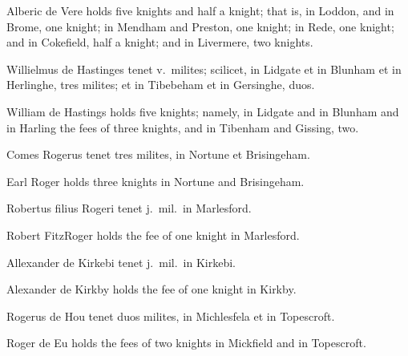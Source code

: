 \documentclass{book}
\begin{document}
\begin{paracol}{2}
\switchcolumn

Alberic de Vere holds five knights and half a knight; that is, in Loddon, and in Brome, one knight; in Mendham and Preston, one knight; in Rede, one knight; and in Cokefield, half a knight; and in Livermere, two knights.

\switchcolumn*

\begin{otherlanguage}{latin}
Willielmus de Hastinges tenet v.\ milites; scilicet, in Lidgate et in Blunham et in Herlinghe, tres milites; et in Tibebeham et in Gersinghe, duos.
\end{otherlanguage}

\switchcolumn

William de Hastings holds five knights; namely, in Lidgate and in Blunham and in Harling the fees of three knights, and in Tibenham and Gissing, two.

\switchcolumn*

\begin{otherlanguage}{latin}
Comes Rogerus tenet tres milites, in Nortune et Brisingeham.
\end{otherlanguage}

\switchcolumn

Earl Roger holds three knights in Nortune and Brisingeham.

\switchcolumn*

\begin{otherlanguage}{latin}
Robertus filius Rogeri tenet j.\ mil.\ in Marlesford.
\end{otherlanguage}

\switchcolumn

Robert FitzRoger holds the fee of one knight in Marlesford.

\switchcolumn*

\begin{otherlanguage}{latin}
Allexander de Kirkebi tenet j.\ mil.\ in Kirkebi.
\end{otherlanguage}

\switchcolumn

Alexander de Kirkby holds the fee of one knight in Kirkby.

\switchcolumn*

\begin{otherlanguage}{latin}
Rogerus de Hou tenet duos milites, in Michlesfela et in Topescroft.
\end{otherlanguage}

\switchcolumn

Roger de Eu holds the fees of two knights in Mickfield and in Topescroft.


\end{paracol}
\end{document}
